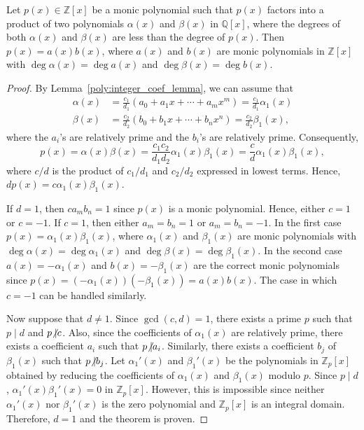  
\begin{theorem}\label{poly:Gauss_lemma}
Let $p(x) \in {\mathbb Z}[x]$ be a monic polynomial such that $p(x)$
factors into a product of two polynomials $\alpha(x)$ and $\beta(x)$
in ${\mathbb Q}[x]$, where the degrees of both $\alpha(x)$ and $\beta(x)$
are less than the degree of $p(x)$. Then $p(x) = a(x) b(x)$, where
$a(x)$ and $b(x)$ are monic polynomials in ${\mathbb Z}[x]$ with $\deg
\alpha(x) = \deg a(x)$ and $\deg \beta(x) = \deg b(x)$. 
\end{theorem}
 
 
\begin{proof}
By Lemma~\ref{poly:integer_coef_lemma}, we can assume that
\begin{align*}
\alpha(x)  & =  \frac{c_1}{d_1} (a_0 + a_1 x + \cdots + a_m x^m )=
\frac{c_1}{d_1} \alpha_1(x) \\
\beta(x)  & =  \frac{c_2}{d_2} (b_0 + b_1 x + \cdots + b_n x^n)  =
\frac{c_2}{d_2} \beta_1(x),
\end{align*}
where the $a_i$'s are relatively prime and the $b_i$'s are relatively
prime. Consequently, 
\[
p(x) = \alpha(x) \beta(x) = \frac{c_1 c_2}{d_1 d_2} \alpha_1(x)
\beta_1(x) = \frac{c}{d} \alpha_1(x) \beta_1(x),
\]
where  $c/d$ is the product of $c_1/d_1$ and $c_2/d_2$ expressed in
lowest terms. Hence, $d p(x) = c \alpha_1(x) \beta_1(x)$. 

 
 
If $d = 1$, then $c a_m b_n = 1$ since $p(x)$ is a monic polynomial.
Hence, either $c=1$ or $c = -1$. If $c=1$, then either $a_m = b_n = 1$ or
$a_m = b_n = -1$. In the first case $p(x) = \alpha_1(x) \beta_1(x)$,
where $\alpha_1(x)$ and $\beta_1(x)$ are monic polynomials with $\deg
\alpha(x) = \deg \alpha_1(x)$ and $\deg \beta(x) = \deg \beta_1(x)$.
In the second case $a(x) = -\alpha_1(x)$ and $b(x) = -\beta_1(x)$ are
the correct monic polynomials since $p(x) = (-\alpha_1(x))(-
\beta_1(x)) = a(x) b(x)$. The case in which $c = -1$ can be handled
similarly. 
 
 
Now suppose that $d \neq 1$. Since $\gcd(c, d) = 1$, there exists a
prime $p$ such that $p \mid d$ and $p {\not{\mid}} c$. Also, since the
coefficients of $\alpha_1(x)$ are relatively prime, there exists a
coefficient $a_i$ such that $p {\not{\mid}} a_i$.  Similarly, there exists
a coefficient $b_j$ of $\beta_1(x)$ such that $p {\not{\mid}} b_j$. Let 
$\alpha_1'(x)$ and $\beta_1'(x)$ be the polynomials in ${\mathbb Z}_p[x]$
obtained by reducing the coefficients of $\alpha_1(x)$ and
$\beta_1(x)$ modulo $p$. Since $p \mid d$, $\alpha_1'(x) \beta_1'(x) = 
0$ in ${\mathbb Z}_p[x]$. However, this is impossible since neither
$\alpha_1'(x)$ nor $\beta_1'(x)$ is the zero polynomial and ${\mathbb
Z}_p[x]$ is an integral domain.  Therefore, $d=1$ and the theorem is
proven. 
\end{proof}
 
